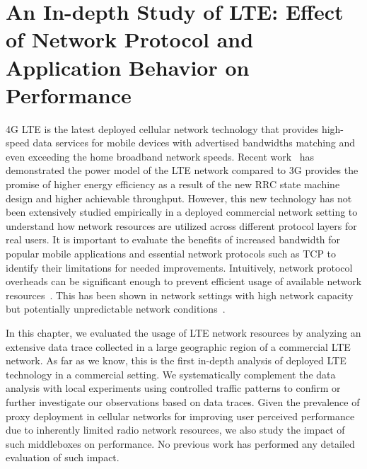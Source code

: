 \chapter{An In-depth Study of LTE: Effect of Network Protocol and Application Behavior on Performance}
\label{chap:tcp}

4G LTE is the latest deployed cellular network technology that
provides high-speed data services for mobile devices with advertised
bandwidths matching and even exceeding the home broadband network
speeds. Recent work~\cite{huang_mobisys12} has demonstrated the power model of the LTE
network compared to 3G provides the promise of higher energy
efficiency as a result of the new RRC state machine design and higher
achievable throughput. However, this new technology has not been
extensively studied empirically in a deployed commercial network setting to
understand how network resources are utilized across different
protocol layers for real users. It is important to evaluate the
benefits of increased bandwidth for popular mobile applications and
essential network protocols such as TCP to identify their limitations
for needed improvements. Intuitively, network protocol overheads can
be significant enough to prevent efficient usage of available network
resources~\cite{Zhuang:A3:Mobicom2006}. This has been shown in network settings with high network
capacity but potentially unpredictable network conditions~\cite{rfc1323}.

In this chapter, we evaluated the usage of LTE network resources by
analyzing an extensive data trace collected in a large geographic
region of a commercial LTE network. As far as we know, this is the
first in-depth analysis of deployed LTE technology in a commercial
setting.  We systematically complement the data analysis with local
experiments using controlled traffic patterns to confirm or further
investigate our observations based on data traces. Given the
prevalence of proxy deployment in cellular networks for improving user
perceived performance due to inherently limited radio network
resources, we also study the impact of such middleboxes on
performance. No previous work has performed any detailed evaluation of
such impact.


